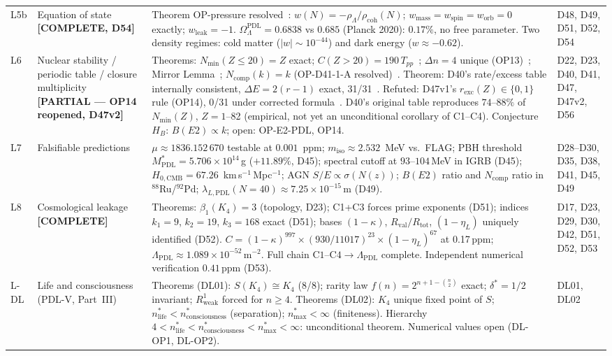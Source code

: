 \documentclass[11pt,a4paper]{article}
\newcommand{\Rval}{R_{\mathrm{val}}}
\theoremstyle{plain}
\theoremstyle{definition}
\theoremstyle{remark}
\newcommand{\Rtot}{R_{\mathrm{tot}}}
\newcommand{\Tpp}{T_{pp}}
\newcommand{\rhocoh}{\rho_{\mathrm{coh}}}
\begin{document}
\begin{longtable}{L{0.6cm}L{3.0cm}L{5.5cm}L{4.0cm}}
L5b & Equation of state \textbf{[COMPLETE, D54]} & \textcolor{proofblue}{Theorem} OP-pressure resolved~\cite{D54}: $w(N) = -\rho_\Lambda/\rhocoh(N)$; $w_{\mathrm{mass}}=w_{\mathrm{spin}}=w_{\mathrm{orb}}=0$ exactly; $w_{\mathrm{leak}}=-1$. $\Omega_\Lambda^{\mathrm{PDL}}=0.6838$ vs $0.685$ (Planck 2020): $0.17\%$, no free parameter. Two density regimes: cold matter ($|w|\sim 10^{-44}$) and dark energy ($w \approx -0.62$). & D48, D49, D51, D52, D54\\[0.4em]
L6 & Nuclear stability / periodic table / closure multiplicity \textbf{[PARTIAL --- OP14 reopened, D47v2]} & \textcolor{proofblue}{Theorems}: $N_{\min}(Z\leq20)=Z$ exact; $C(Z>20)=190\,\Tpp$~\cite{D40}; $\Delta n=4$ unique (OP13)~\cite{D47}; Mirror Lemma~\cite{D47}; $N_{\mathrm{comp}}(k)=k$ (OP-D41-1-A resolved)~\cite{D56}. \textcolor{proofblue}{Theorem}: D40's rate/excess table internally consistent, $\Delta E=2(r-1)$ exact, 31/31~\cite{D47v2}. \textcolor{negativered}{Refuted}: D47v1's $r_{\mathrm{exc}}(Z)\in\{0,1\}$ rule (OP14), 0/31 under corrected formula~\cite{D47v2}. D40's original table reproduces $74$--$88\%$ of $N_{\min}(Z)$, $Z=1$--82 (empirical, not yet an unconditional corollary of C1--C4). \textcolor{conjecturegreen}{Conjecture} $H_B$: $B(E2)\propto k$; open: OP-E2-PDL, OP14. & D22, D23, D40, D41, D47, D47v2, D56\\[0.4em]
L7 & Falsifiable predictions & $\mu\approx 1836.152\,670$ testable at $0.001$~ppm; $m_{\mathrm{iso}}\approx 2.532$~MeV vs.\ FLAG; PBH threshold $M^*_{\mathrm{PDL}}=5.706\times10^{14}$\,g ($+11.89\%$, D45); spectral cutoff at $93$--$104$\,MeV in IGRB (D45); $H_{0,\mathrm{CMB}}=67.26$~km\,s$^{-1}$\,Mpc$^{-1}$; AGN $S/E \propto \sigma(N(z))$; $B(E2)$ ratio and $N_{\mathrm{comp}}$ ratio in $^{88}$Ru/$^{92}$Pd; $\lambda_{L,\mathrm{PDL}}(N=40) \approx 7.25\times10^{-15}$\,m (D49). & D28--D30, D35, D38, D41, D45, D49\\[0.3em]
L8 & Cosmological leakage \textbf{[COMPLETE]} & \textcolor{proofblue}{Theorems}: $\beta_1(K_4)=3$ (topology, D23); C1+C3 forces prime exponents (D51); indices $k_1=9$, $k_2=19$, $k_3=168$ exact (D51); bases $(1-\kappa)$, $\Rval/\Rtot$, $(1-\eta_L)$ uniquely identified (D52). $C=(1-\kappa)^{997}\times(930/11017)^{23}\times(1-\eta_L)^{67}$ at 0.17\,ppm; $\Lambda_{\mathrm{PDL}}\approx 1.089\times10^{-52}$\,m$^{-2}$. Full chain $\mathrm{C1\text{--}C4}\to\Lambda_{\mathrm{PDL}}$ complete. Independent numerical verification $0.41$\,ppm (D53). & D17, D23, D29, D30, D42, D51, D52, D53\\[0.3em]
L-DL & Life and consciousness (PDL-V, Part~III) & \textcolor{proofblue}{Theorems} (DL01): $S(K_4)\cong K_4$ (8/8); rarity law $f(n)=2^{n+1-\binom{n}{2}}$ exact; $\delta^*=1/2$ invariant; $R^1_{\mathrm{weak}}$ forced for $n\geq 4$. \textcolor{proofblue}{Theorems} (DL02): $K_4$ unique fixed point of $S$; $n^*_{\mathrm{life}} < n^*_{\mathrm{consciousness}}$ (separation); $n^*_{\mathrm{max}}<\infty$ (finiteness). Hierarchy $4 < n^*_{\mathrm{life}} < n^*_{\mathrm{consciousness}} < n^*_{\mathrm{max}} < \infty$: unconditional theorem. Numerical values open (DL-OP1, DL-OP2). & DL01, DL02\\[0.3em]

\end{longtable}
\end{document}
